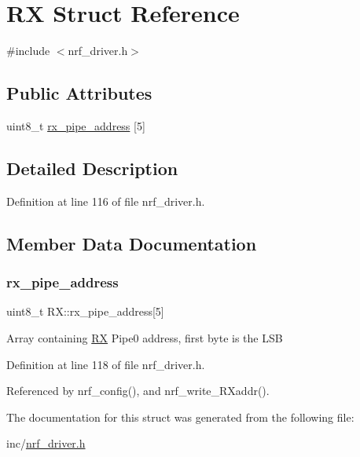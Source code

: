 \hypertarget{struct_r_x}{}\section{RX Struct Reference}
\label{struct_r_x}


{\ttfamily \#include $<$nrf\+\_\+driver.\+h$>$}

\subsection*{Public Attributes}
\begin{DoxyCompactItemize}
\item 
uint8\+\_\+t \hyperlink{struct_r_x_a450d4bb6c6e98068a74d727e126f859a}{rx\+\_\+pipe\+\_\+address} \mbox{[}5\mbox{]}
\end{DoxyCompactItemize}


\subsection{Detailed Description}


Definition at line 116 of file nrf\+\_\+driver.\+h.



\subsection{Member Data Documentation}
\mbox{\label{struct_r_x_a450d4bb6c6e98068a74d727e126f859a}} 
\subsubsection{\texorpdfstring{rx\+\_\+pipe\+\_\+address}{rx\_pipe\_address}}
{\footnotesize\ttfamily uint8\+\_\+t R\+X\+::rx\+\_\+pipe\+\_\+address\mbox{[}5\mbox{]}}

Array containing \hyperlink{struct_r_x}{RX} Pipe0 address, first byte is the L\+SB 

Definition at line 118 of file nrf\+\_\+driver.\+h.



Referenced by nrf\+\_\+config(), and nrf\+\_\+write\+\_\+\+R\+Xaddr().



The documentation for this struct was generated from the following file\+:\begin{DoxyCompactItemize}
\item 
inc/\hyperlink{nrf__driver_8h}{nrf\+\_\+driver.\+h}\end{DoxyCompactItemize}
